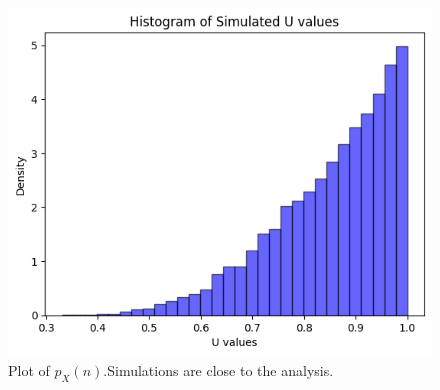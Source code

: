 \documentclass[journal,12pt,onecolumn]{IEEEtran}
\theoremstyle{remark}
\begin{document}
\begin{figure}[!ht]
    \centering
    \includegraphics[width=\columnwidth]{./figs/sim.png}
    \caption{Plot of $p_X(n)$.Simulations are close to the analysis. }
    \end{figure}
\end{document}
